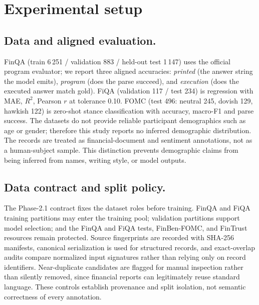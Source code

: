\documentclass[conference]{IEEEtran}
\begin{document}
\section{Experimental setup}\label{sec:setup}
\subsection{Data and aligned evaluation.}
FinQA (train 6\,251 / validation 883 / held-out test 1\,147) uses the official program
evaluator; we report three aligned accuracies: \emph{printed} (the answer string the model
emits), \emph{program} (does the parse succeed), and \emph{execution} (does the executed
answer match gold). FiQA (validation 117 / test 234) is regression with MAE, $R^2$,
Pearson $r$ at tolerance 0.10. FOMC (test 496: neutral 245, dovish 129, hawkish 122) is
zero-shot stance classification with accuracy, macro-F1 and parse success.
The datasets do not provide reliable participant demographics such as age or gender;
therefore this study reports no inferred demographic distribution. The records are treated
as financial-document and sentiment annotations, not as a human-subject sample. This
distinction prevents demographic claims from being inferred from names, writing style, or
model outputs.
\subsection{Data contract and split policy.}
The Phase-2.1 contract fixes the dataset roles before training. FinQA and FiQA training
partitions may enter the training pool; validation partitions support model selection; and
the FinQA and FiQA tests, FinBen-FOMC, and FinTrust resources remain protected. Source
fingerprints are recorded with SHA-256 manifests, canonical serialization is used for
structured records, and exact-overlap audits compare normalized input signatures rather
than relying only on record identifiers. Near-duplicate candidates are flagged for manual
inspection rather than silently removed, since financial reports can legitimately reuse
standard language. These controls establish provenance and split isolation, not semantic
correctness of every annotation.

\begin{table}[t]
\centering
\caption{Dataset roles and split sizes fixed by the Phase-2.1 contract.}
\label{tab:data-contract}
\small
{}
\end{table}
\end{document}
